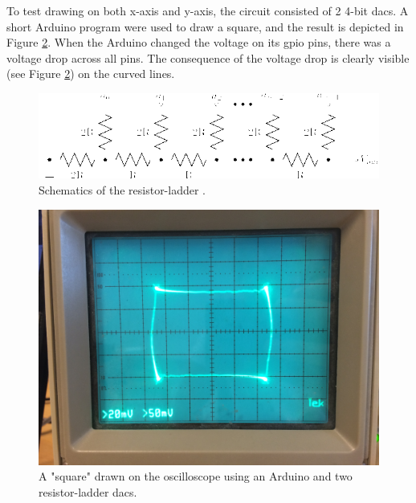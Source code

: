 To test drawing on both x-axis and y-axis, the circuit consisted of 2 4-bit \gls{dac}s.
A short Arduino program were used to draw a square, and the result is depicted in Figure \ref{fig:osc_poc}.
When the Arduino changed the voltage on its \gls{gpio} pins, there was a voltage drop across all pins.
The consequence of the voltage drop is clearly visible (see Figure \ref{fig:osc_poc}) on the curved lines.


\begin{figure}[h]
\includegraphics[width=\columnwidth]{images/r2r-ladder}
\centering
\caption{Schematics of the resistor-ladder \cite{r2r-ladder-schematics}.}
\label{fig:r2r-ladder}
\end{figure}

\begin{figure}[h]
\includegraphics[width=\columnwidth]{images/osc_square_close}
\centering
\caption{A "square" drawn on the oscilloscope using an Arduino and two resistor-ladder \gls{dac}s.}
\label{fig:osc_poc}
\end{figure}
